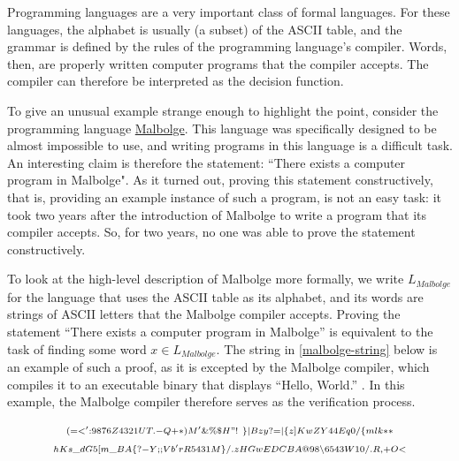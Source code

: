 \begin{example}Programming languages are a very important class of formal languages. For these languages, the alphabet is usually (a subset) of the ASCII table, and the grammar is defined by the rules of the programming language's compiler. Words, then, are  properly written computer programs that the compiler accepts. The compiler can therefore be interpreted as the decision function.

To give an unusual example strange enough to highlight the point, consider the programming language \href{https://en.wikipedia.org/wiki/Malbolge}{Malbolge}. This language was specifically designed to be almost impossible to use, and writing programs in this language is a difficult task. An interesting claim is therefore the statement: ``There exists a computer program in Malbolge". As it turned out, proving this statement constructively, that is, providing an example instance of such a program, is not an easy task: it took two years after the introduction of Malbolge to write a program that its compiler accepts. So, for two years, no one was able to prove the statement constructively.

To look at the high-level description of Malbolge more formally, we write $L_{Malbolge}$ for the language that uses the ASCII table as its alphabet, and its words are strings of ASCII letters that the Malbolge compiler accepts. Proving the statement ``There exists a computer program in Malbolge'' is equivalent to the task of finding some word $x\in L_{Malbolge}$. The string in \eqref{malbolge-string} below is an example of such a proof, as it is excepted by the Malbolge compiler, which compiles it to an executable binary that displays ``Hello, World.'' . In this example, the Malbolge compiler therefore serves as the verification process.

\begin{multline}\label{malbolge-string}
\scriptstyle (=<':9876Z4321UT.-Q+*)M'\&\%\$H"!~\}|Bzy?=|\{z]KwZY44Eq0/
\{mlk** \\ 
\scriptstyle hKs\_dG5[m\_BA\{?-Y;;Vb'rR5431M\}/.zHGwEDCBA@98\backslash 6543W10/.R,+O<
\end{multline}
\end{example}
